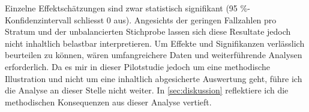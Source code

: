 Einzelne Effektschätzungen sind zwar statistisch signifikant (95 \%-Konfidenzintervall schliesst 0 aus). Angesichts der geringen Fallzahlen pro Stratum und der unbalancierten Stichprobe lassen sich diese Resultate jedoch nicht inhaltlich belastbar interpretieren. Um Effekte und Signifikanzen verlässlich beurteilen zu können, wären umfangreichere Daten und weiterführende Analysen erforderlich. Da es mir in dieser Pilotstudie jedoch um eine methodische Illustration und nicht um eine inhaltlich abgesicherte Auswertung geht, führe ich die Analyse an dieser Stelle nicht weiter. In \cref{sec:diskussion} reflektiere ich die methodischen Konsequenzen aus dieser Analyse vertieft.

